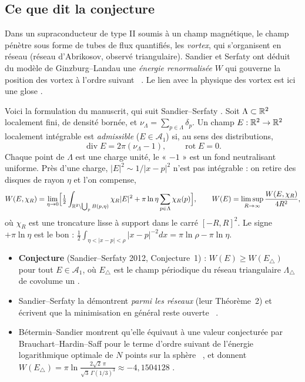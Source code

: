\subsection{Ce que dit la conjecture}\label{ch2:ssec:ssconj}
\begin{physbox}
Dans un supraconducteur de type II soumis à un champ magnétique, le champ pénètre sous forme de tubes de flux
quantifiés, les \emph{vortex}, qui s'organisent en réseau (réseau d'Abrikosov, observé triangulaire). Sandier et Serfaty
ont déduit du modèle de Ginzburg--Landau une \emph{énergie renormalisée} $W$ qui gouverne la position des vortex à
l'ordre suivant~\cite{ch2ss} \tierL. Le lien avec la physique des vortex est ici une glose \tierC.
\end{physbox}
Voici la formulation du manuscrit, qui suit Sandier--Serfaty \tierL. Soit $\Lambda\subset\mathbb{R}^2$ localement fini, de
densité bornée, et $\nu_\Lambda=\sum_{p\in\Lambda}\delta_p$. Un champ $E:\mathbb{R}^2\to\mathbb{R}^2$ localement intégrable est
\emph{admissible} ($E\in\mathcal A_1$) si, au sens des distributions,
\[\operatorname{div}E=2\pi(\nu_\Lambda-1),\qquad\operatorname{rot}E=0 .\]
Chaque point de $\Lambda$ est une charge unité, le « $-1$ » est un fond neutralisant uniforme. Près d'une charge,
$|E|^2\sim1/|x-p|^2$ n'est pas intégrable : on retire des disques de rayon $\eta$ et l'on compense,
\[W(E,\chi_R)=\lim_{\eta\to0}\Bigl[\tfrac12\int_{\mathbb{R}^2\setminus\bigcup_pB(p,\eta)}\chi_R|E|^2+\pi\ln\eta\sum_{p\in\Lambda}\chi_R(p)\Bigr],
\qquad W(E)=\limsup_{R\to\infty}\frac{W(E,\chi_R)}{4R^2},\]
où $\chi_R$ est une troncature lisse à support dans le carré $[-R,R]^2$. Le signe $+\pi\ln\eta$ est le bon :
$\frac12\int_{\eta<|x-p|<\rho}|x-p|^{-2}dx=\pi\ln\rho-\pi\ln\eta$.
\begin{itemize}
\item \textbf{Conjecture} (Sandier--Serfaty 2012, Conjecture~1) : $W(E)\ge W(E_\triangle)$ pour tout $E\in\mathcal A_1$,
où $E_\triangle$ est le champ périodique du réseau triangulaire $\Lambda_\triangle$ de covolume un \tierL.
\item Sandier--Serfaty la démontrent \emph{parmi les réseaux} (leur Théorème~2) et écrivent que la minimisation en
général reste ouverte \tierL~\cite{ch2ss}.
\item Bétermin--Sandier montrent qu'elle équivaut à une valeur conjecturée par Brauchart--Hardin--Saff pour le terme
d'ordre suivant de l'énergie logarithmique optimale de $N$ points sur la sphère~\cite{ch2bs,ch2bhs} \tierL, et donnent
$W(E_\triangle)=\pi\ln\frac{2\sqrt2\,\pi}{\sqrt3\,\Gamma(1/3)^3}\approx-4{,}1504128$ \tierL.
\end{itemize}

